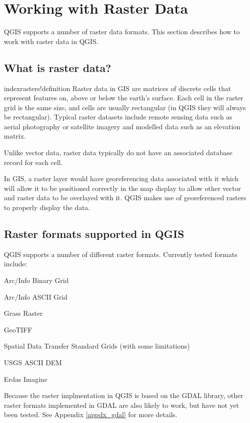 \section{Working with Raster Data}
QGIS supports a number of raster data formats. This section describes how to work with raster data in QGIS.
\subsection{What is raster data?}
index{rasters!definition}
Raster data in GIS are matrices of discrete cells that represent features on, above or below the earth's surface. Each cell in the raster grid is the same size, and cells are usually rectangular (in QGIS they will always be rectangular). Typical raster datasets include remote sensing data such as aerial photography or satellite imagery and modelled data such as an elevation matrix.

Unlike vector data, raster data typically do not have an associated database record for each cell.

In GIS, a raster layer would have georeferencing data associated with it which
will allow it to be positioned correctly in the map display to allow other
vector and raster data to be overlayed with it. QGIS makes use of georeferenced
rasters to properly display the data.
	
\subsection{Raster formats supported in QGIS}
QGIS supports a number of different raster formats. Currently tested formats
include:
\begin{compactitem}
\item Arc/Info Binary Grid
\item Arc/Info ASCII Grid
\item Grass Raster
\item GeoTIFF
\item Spatial Data Transfer Standard Grids (with some limitations)
\item USGS ASCII DEM
\item Erdas Imagine
\end{compactitem}
Because the raster implmentation in QGIS is based on the GDAL library, other
raster formats implemented in GDAL are also likely to work, but have not yet
been tested. See Appendix \ref{appdx_gdal} for more
details.
	
